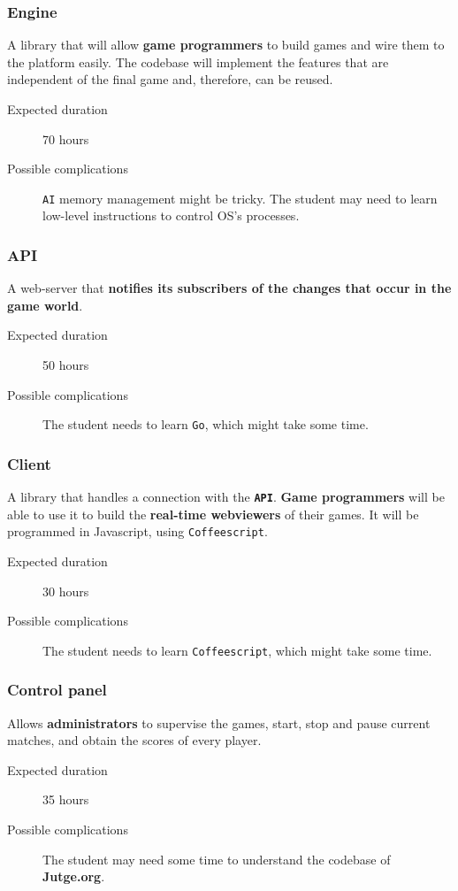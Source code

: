 \documentclass[a4paper,11pt,titlepage,abstract,numbers=noenddot,automark,mnsy,intlimits,rgb,dvipsnames]{report}
\begin{document}
\subsubsection{Engine}
A library that will allow \textbf{game programmers} to build games and wire them to the platform
easily. The codebase will implement the features that are independent of the final game and, therefore, can be reused.
\begin{description}
\item[Expected duration]
70 hours
\item[Possible complications]
\texttt{AI} memory management might be tricky.
  The student may need to learn low-level instructions to control OS's processes.
\end{description}
\subsubsection{API}
A web-server that \textbf{notifies its subscribers of the changes that occur in the game world}.
\begin{description}
\item[Expected duration]
50 hours
\item[Possible complications]
The student needs to learn \texttt{Go}, which might take some time.
\end{description}
\subsubsection{Client}
A library that handles a connection with the \textbf{\texttt{API}}. \textbf{Game programmers} will be able to use it to build
the \textbf{real-time webviewers} of their games. It will be programmed in \texttt{}Javascript\texttt{}, using \texttt{Coffeescript}.
\begin{description}
\item[Expected duration]
30 hours
\item[Possible complications]
The student needs to learn \texttt{Coffeescript}, which might take some time.
\end{description}
\subsubsection{Control panel}
Allows \textbf{administrators} to supervise the games, start, stop and pause current matches, and obtain the
scores of every player.
\begin{description}
\item[Expected duration]
35 hours
\item[Possible complications]
The student may need some time to understand the codebase of \textbf{Jutge.org}.
\end{description}
\end{document}
